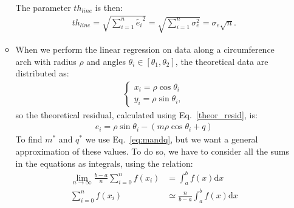 \begin{itemize}
\begin{itemize}
\begin{align}
\end{align} 
The parameter $th_{line}$ is then:
\begin{align}
th_{line} = \sqrt{\sum_{i=1}^{n}{\tilde{e_i}^2}} = \sqrt{\sum_{i=1}^{n}{\sigma_e^2}} = \sigma_e\sqrt{n}.
\end{align}
\item When we perform the linear regression on data along a circumference arch with radius $\rho$ and angles $\theta_i \in [\theta_1,\theta_2]$, the theoretical data are distributed as:
\begin{align}
\begin{cases}
x_i = \rho\cos{\theta_i}\\[5pt]
y_i = \rho\sin{\theta_i},
\end{cases}
\end{align} 
so the theoretical residual, calculated using Eq.~\eqref{theor_resid}, is:
\begin{align}
e_i = \rho\sin{\theta_i} - (m\rho\cos{\theta_i} + q)
\end{align}
To find $m^*$ and $q^*$ we use Eq.~\eqref{eq:mandq}, but we want a general approximation of these values. To do so, we have  to consider all the sums in the equations as integrals, using the relation:
\begin{align}
\lim_{n \to \infty} { \frac{b-a}{n} \sum_{i=0}^{n}{f(x_i)}} &=   \int_a^b{f(x )\mathrm  {d}x} \\[10pt]
 \sum_{i=0}^{n}{f(x_i)} &\simeq \frac{n}{b-a} \int_a^b{f(x )\mathrm  {d}x}
\label{eq:integralsandsums}
\end{align} 


\end{itemize}
\end{itemize}
